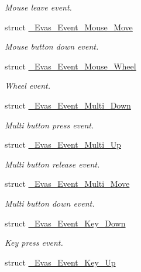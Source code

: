 \begin{DoxyCompactItemize}
\begin{DoxyCompactList}\small\item\em Mouse leave event. \item\end{DoxyCompactList}\item 
struct \hyperlink{struct__Evas__Event__Mouse__Move}{\_\-Evas\_\-Event\_\-Mouse\_\-Move}
\begin{DoxyCompactList}\small\item\em Mouse button down event. \item\end{DoxyCompactList}\item 
struct \hyperlink{struct__Evas__Event__Mouse__Wheel}{\_\-Evas\_\-Event\_\-Mouse\_\-Wheel}
\begin{DoxyCompactList}\small\item\em Wheel event. \item\end{DoxyCompactList}\item 
struct \hyperlink{struct__Evas__Event__Multi__Down}{\_\-Evas\_\-Event\_\-Multi\_\-Down}
\begin{DoxyCompactList}\small\item\em Multi button press event. \item\end{DoxyCompactList}\item 
struct \hyperlink{struct__Evas__Event__Multi__Up}{\_\-Evas\_\-Event\_\-Multi\_\-Up}
\begin{DoxyCompactList}\small\item\em Multi button release event. \item\end{DoxyCompactList}\item 
struct \hyperlink{struct__Evas__Event__Multi__Move}{\_\-Evas\_\-Event\_\-Multi\_\-Move}
\begin{DoxyCompactList}\small\item\em Multi button down event. \item\end{DoxyCompactList}\item 
struct \hyperlink{struct__Evas__Event__Key__Down}{\_\-Evas\_\-Event\_\-Key\_\-Down}
\begin{DoxyCompactList}\small\item\em Key press event. \item\end{DoxyCompactList}\item 
struct \hyperlink{struct__Evas__Event__Key__Up}{\_\-Evas\_\-Event\_\-Key\_\-Up}

\end{DoxyCompactItemize}
